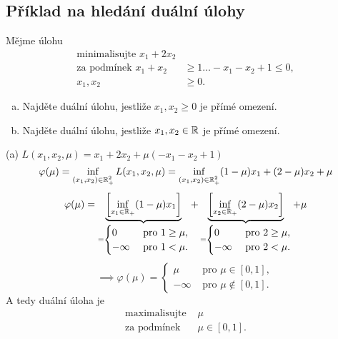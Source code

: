 \subsection{Příklad na hledání duální úlohy}
Mějme úlohu
\begin{align*}
    \text{minimalisujte } x_1 + 2x_2 \\
    \text{za podmínek } x_1 + x_2 &\geq 1 \dots -x_1 -x_2 + 1 \leq 0, \\
    x_1, x_2 &\geq 0.
\end{align*}
\begin{enumerate}[(a)]
    \item Najděte duální úlohu, jestliže $x_1, x_2 \geq 0$ je přímé omezení.
    \item Najděte duální úlohu, jestliže $x_1, x_2 \in \mathbb{R}$ je přímé omezení.
\end{enumerate}
(a) $L(x_1, x_2, \mu) = x_1 + 2x_2 + \mu(-x_1 -x_2 + 1)$
\[
    \varphi(\mu) = \inf_{(x_1, x_2) \in \mathbb{R}_+^2} L(x_1, x_2, \mu) = \inf_{(x_1, x_2) \in \mathbb{R}_+^2} (1-\mu)x_1 + 
    (2-\mu)x_2 + \mu
\]
\[
    \varphi(\mu) = \underbrace{\left[\inf_{x_1 \in \mathbb{R}_+} (1-\mu)x_1\right]}_{=
    \begin{cases}
        0 &\text{ pro } 1 \geq \mu, \\
        - \infty &\text{ pro } 1 < \mu.
    \end{cases}} + \underbrace{\left[\inf_{x_2 \in \mathbb{R}_+} (2-\mu)x_2\right]}_{=
    \begin{cases}
        0 &\text{ pro } 2 \geq \mu, \\
        - \infty &\text{ pro } 2 < \mu.
    \end{cases}} + \mu
\]
\[
    \implies \varphi(\mu) =
    \begin{cases}
        \mu &\text{ pro } \mu \in [0,1], \\
        -\infty &\text{ pro } \mu \not\in [0,1].
    \end{cases}
\]
A tedy duální úloha je
\begin{align*}
    \text{maximalisujte }& \mu \\
    \text{za podmínek }& \mu \in [0,1].
\end{align*}

